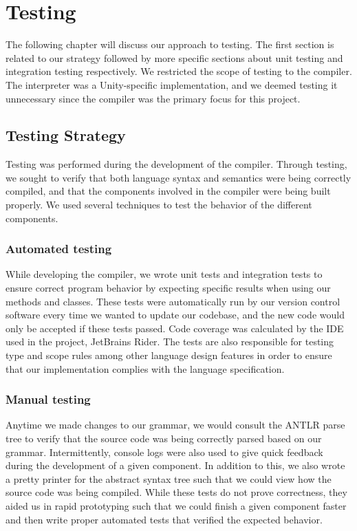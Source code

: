 \chapter{Testing}

The following chapter will discuss our approach to testing.
The first section is related to our strategy followed by more specific sections about unit testing and integration testing respectively.
We restricted the scope of testing to the compiler. The interpreter was a Unity-specific implementation, and we deemed testing it unnecessary since the compiler was the primary focus for this project.

\section{Testing Strategy}
Testing was performed during the development of the \dazel{} compiler. 
Through testing, we sought to verify that both language syntax and semantics were being correctly compiled, and that the components involved in the compiler were being built properly.
We used several techniques to test the behavior of the different components. 

\subsection*{Automated testing}
While developing the compiler, we wrote unit tests and integration tests to ensure correct program behavior by expecting specific results when using our methods and classes. 
These tests were automatically run by our version control software every time we wanted to update our codebase, and the new code would only be accepted if these tests passed.
Code coverage was calculated by the IDE used in the project, JetBrains Rider\cite{rider_test_coverage}.
The tests are also responsible for testing type and scope rules among other language design features in order to ensure that our implementation complies with the language specification.

\subsection*{Manual testing}
Anytime we made changes to our grammar, we would consult the ANTLR parse tree to verify that the source code was being correctly parsed based on our grammar. 
Intermittently, console logs were also used to give quick feedback during the development of a given component.
In addition to this, we also wrote a pretty printer for the abstract syntax tree such that we could view how the source code was being compiled.
While these tests do not prove correctness, they aided us in rapid prototyping such that we could finish a given component faster and then write proper automated tests that verified the expected behavior.  

